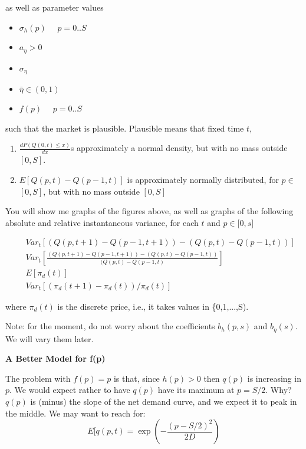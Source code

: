 \documentclass{article}
\begin{document}
as well as parameter values

\begin{itemize}
\item $\sigma _{h}(p)$ \ \ $p=0..S$

\item $a_{\eta }>0$

\item $\sigma _{\eta }$

\item $\bar{\eta}\in (0,1)$

\item $f(p)$ \ \ $p=0..S$
\end{itemize}

such that the market is plausible. Plausible means that fixed time $t$,

\begin{enumerate}
\item $\frac{dP(Q(0,t)\leq x)}{dx}$s approximately a normal density, but
with no mass outside $[0,S]$.

\item $E[Q(p,t)-Q(p-1,t)]$ is approximately normally distributed, for $p\in $
$[0,S]$, but with no mass outside $[0,S]$
\end{enumerate}

\bigskip

You will show me graphs of the figures above, as well as graphs of the
following absolute and relative instantaneous variance, for each $t$ and $%
p\in \lbrack 0,s]$

\begin{eqnarray*}
&&Var_{t}[(Q(p,t+1)-Q(p-1,t+1))-(Q(p,t)-Q(p-1,t))] \\
&&Var_{t}[\frac{(Q(p,t+1)-Q(p-1,t+1))-(Q(p,t)-Q(p-1,t))}{(Q(p,t)-Q(p-1,t)}]
\\
&&E[\pi _{d}(t)] \\
&&Var_{t}[(\pi _{d}(t+1)-\pi _{d}(t))/\pi _{d}(t)]
\end{eqnarray*}

where $\pi _{d}(t)$ is the discrete price, i.e., it takes values in
\{0,1,...,S).

Note: for the moment, do not worry about the coefficients $b_{h}(p,s)$ and $%
b_{\eta }(s)$. We will vary them later.

\bigskip

\textbf{A Better Model for f(p)}

The problem with $f(p)=p$ is that, since $h(p)>0$ then $q(p)$ is increasing
in $p$. We would expect rather to have $q(p)$ have its maximum at $p=S/2$.
Why?$q(p)$ is (minus) the slope of the net demand curve, and we expect it to
peak in the middle. We may want to reach for:%
\begin{equation*}
E[q(p,t)=\exp (-\frac{(p-S/2)^{2}}{2D})
\end{equation*}
\end{document}
